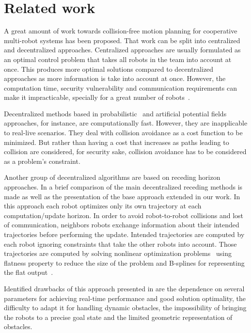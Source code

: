 \section{Related work}

A great amount of work towards collision-free motion 
planning for cooperative multi-robot systems has been proposed. That work can
be split into centralized and decentralized approaches.
Centralized approaches are usually formulated as an optimal
control problem that takes all robots in the team into account at once.
This produces more optimal solutions compared to decentralized approaches as more information 
is take into account at once. However, the computation time, security vulnerability and communication 
requirements can make it impracticable, specially for a great number of 
robots~\cite{Borrelli2006}.

Decentralized methods based in probabilistic~\cite{Sanchez2002} and artificial 
potential fields~\cite{Khatib1986} approaches, for instance, are computationally fast.
However, they are inapplicable to real-live scenarios. They deal with collision avoidance as a cost function to be minimized. But rather than having a cost that increases as paths leading
to collision are considered, for security sake, collision avoidance has to be considered as a problem's constraint.

Another group of decentralized algorithms are based on receding horizon approaches.
In \cite{Defoort2009} a brief comparison of the main decentralized receding 
methods is made as well as the presentation of the base approach extended in
our work.
In this approach each robot optimizes only its own 
trajectory at each computation/update horizon. In order to
avoid robot-to-robot collisions and lost of communication, neighbors robots 
exchange information about their intended trajectories before 
performing the update. Intended trajectories are computed by each robot
ignoring constraints that take the other robots into account.
Those trajectories are computed by
solving nonlinear optimization problems~\cite{betts1998survey}
using flatness property to reduce the size of the problem and B-splines for representing
the flat output~\cite{milam2003real}.

Identified drawbacks of this approach presented in \cite{Defoort2009} are the dependence on 
several parameters for achieving real-time performance and good solution 
optimality, the difficulty to adapt it for handling dynamic obstacles, the 
impossibility of bringing the robots to a precise goal state and the limited
geometric representation of obstacles.

